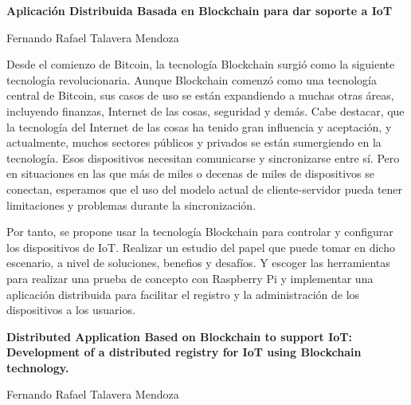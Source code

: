 \myemptypage


\myemptypage
\thispagestyle{empty}

\begin{center}
{\large\bfseries Aplicación Distribuida Basada en Blockchain para dar soporte a IoT}\\
\end{center}
\begin{center}
Fernando Rafael Talavera Mendoza\\
\end{center}


\vspace{0.7cm}

\vspace{5mm}

Desde el comienzo de Bitcoin, la tecnología Blockchain surgió como la siguiente tecnología revolucionaria. 
Aunque Blockchain comenzó como una tecnología central de Bitcoin, sus casos de uso se están expandiendo a 
muchas otras áreas, incluyendo finanzas, Internet de las cosas, seguridad y demás. Cabe destacar, que la 
tecnología del Internet de las cosas ha tenido gran influencia y aceptación, y actualmente, muchos sectores 
públicos y privados se están sumergiendo en la tecnología. Esos dispositivos necesitan comunicarse y 
sincronizarse entre sí. Pero en situaciones en las que más de miles o decenas de miles de dispositivos se 
conectan, esperamos que el uso del modelo actual de cliente-servidor pueda tener limitaciones y problemas 
durante la sincronización. 

\vspace{5mm}

\noindent Por tanto, se propone usar la tecnología Blockchain para controlar y configurar los dispositivos 
de IoT. Realizar un estudio del papel que puede tomar en dicho escenario, a nivel de soluciones, benefios 
y desafíos. Y escoger las herramientas para realizar una prueba de concepto con Raspberry Pi y implementar
una aplicación distribuida para facilitar el registro y la administración de los dispositivos a los 
usuarios.

\newpage
\thispagestyle{empty}

\begin{center}
{\large\bfseries Distributed Application Based on Blockchain to support IoT: Development of a distributed registry for 
IoT using Blockchain technology.}\\
\end{center}
\begin{center}
Fernando Rafael Talavera Mendoza\\
\end{center}

